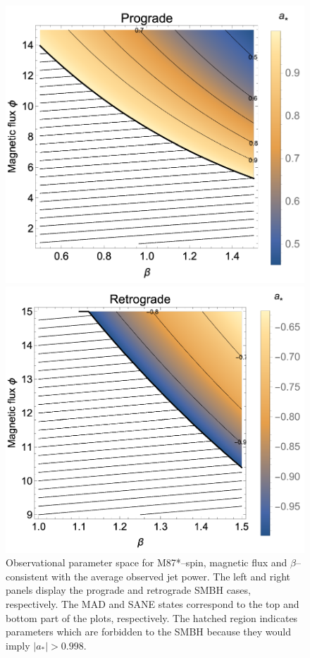 \documentclass[twocolumn]{aastex62} %
\begin{document}
\begin{figure}
    \centering
    \begin{minipage}{0.45\textwidth}
        \centering
        \includegraphics[width=\textwidth]{figures/phi-beta-spins-prograde.pdf} %
    \end{minipage}\hfill
    \begin{minipage}{0.45\textwidth}
        \centering
        \includegraphics[width=\textwidth]{figures/phi-beta-spins-retrograde.pdf} %
    \end{minipage}
\caption{Observational parameter space for M87*--spin, magnetic flux and $\beta$--consistent with the average observed jet power. The left and right panels display the prograde and retrograde SMBH cases, respectively. The MAD and SANE states correspond to the top and bottom part of the plots, respectively. The hatched region indicates parameters which are forbidden to the SMBH because they would imply  $|a_*|>0.998$. }
\label{spins-phi}
\end{figure}
\end{document}
